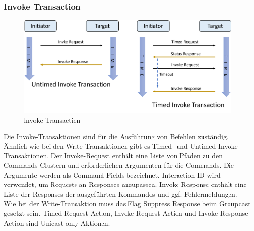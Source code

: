 \documentclass[12pt, a4paper]{article}
\begin{document}
\subsubsection{Invoke Transaction}
\begin{figure}[h]
  \centering
  \includegraphics[scale=0.5]{invoke}
  \caption{Invoke Transaction}
  \label{Invoke Transaction}
\end{figure}
\par Die Invoke-Transaktionen sind für die Ausführung von Befehlen zuständig. Ähnlich wie bei den Write-Transaktionen gibt es Timed- und Untimed-Invoke-Transaktionen. Der Invoke-Request enthält eine Liste von Pfaden zu den Commands-Clustern und erforderlichen Argumenten für die Commands. Die Argumente werden als Command Fields bezeichnet. Interaction ID wird verwendet, um Requests an Responses anzupassen. Invoke Response enthält eine Liste der Responses der ausgeführten Kommandos und ggf. Fehlermeldungen. Wie bei der Write-Transaktion muss das Flag Suppress Response beim Groupcast gesetzt sein. Timed Request Action, Invoke Request Action und Invoke Response Action sind Unicast-only-Aktionen.


\pagebreak

\listoffigures
{}
\end{document}
